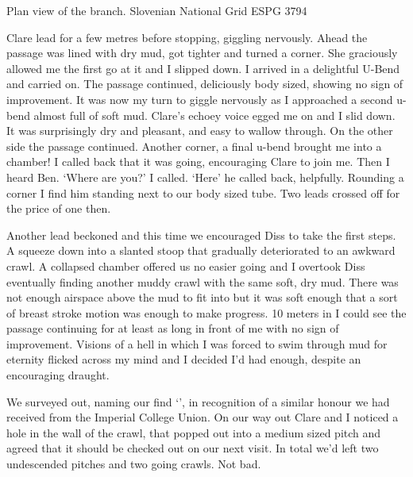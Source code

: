 \begin{marginsurvey}
 \caption[Fenestrator branch]{Plan view of the \protect{} branch. Slovenian National Grid ESPG 3794}
 \label{halleujah inset}
\end{marginsurvey}

Clare lead for a few metres before stopping, giggling nervously. Ahead the passage was lined with dry mud, got tighter and turned a corner. She graciously allowed me the first go at it and I slipped down. I arrived in a delightful U-Bend and carried on. The passage continued, deliciously body sized, showing no sign of improvement. It was now my turn to giggle nervously as I approached a second u-bend almost full of soft mud. Clare's echoey voice egged me on and I slid down. It was surprisingly dry and pleasant, and easy to wallow through. On the other side the passage continued. Another corner, a final  u-bend brought me into a chamber! I called back that it was going, encouraging Clare to join me. Then I heard Ben. 
`Where are you?' I called. 
`Here' he called back, helpfully. 
Rounding a corner I find him standing next to our body sized tube. Two leads crossed off for the price of one then.
 
Another lead beckoned and this time we encouraged Diss to take the first steps. A squeeze down into a slanted stoop that gradually deteriorated to an awkward crawl. A collapsed chamber offered us no easier going and I overtook Diss eventually finding another muddy crawl with the same soft, dry mud. There was not enough airspace above the mud to fit into but it was soft enough that a sort of breast stroke motion was enough to make progress. 10 meters in I could see the passage continuing for at least as long in front of me with no sign of improvement. Visions of a hell in which I was forced to swim through mud for eternity flicked across my mind and I decided I'd had enough, despite an encouraging draught.
 
We surveyed out, naming our find `', in recognition of a similar honour we had received from the Imperial College Union. On our way out Clare and I noticed a hole in the wall of the crawl, that popped out into a medium sized pitch and agreed that it should be checked out on our next visit. In total we'd left two undescended pitches and two going crawls. Not bad.
 
